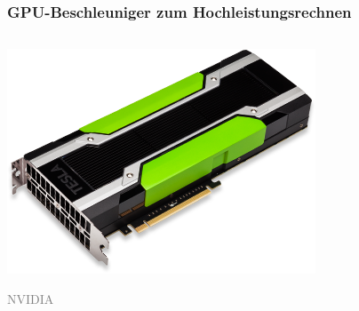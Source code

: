 \begin{frame}
    \frametitle{GPU-Beschleuniger zum Hochleistungsrechnen}
    \begin{columns}\begin{column}{0.5\linewidth}
        \centerline{\includegraphics[height=0.1\textheight]{tesla-3-quater.png}}
        \textcolor{gray}{\scriptsize{NVIDIA}}
    \end{column}\begin{column}{0.5\linewidth}

\end{column}
\end{columns}
\end{frame}
